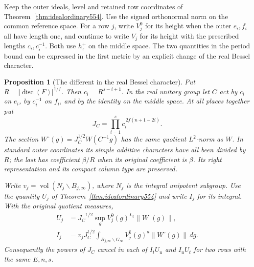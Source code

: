 \documentclass[a4paper,11pt]{article}
\newtheorem{proposition}{Proposition}[section]
\theoremstyle{definition}
\theoremstyle{remark}
\numberwithin{equation}{section}
\begin{document}
Keep the outer ideals, level and retained row coordinates of
Theorem~\ref{thm:idealordinary554}. Use the signed orthonormal
norm on the common reference space. For a row \(j\), write
\(V_j^0\) for its height when the outer \(e_i,f_i\) all have
length one, and continue to write \(V_j\) for its height with
the prescribed lengths \(c_i,c_i^{-1}\). Both use \(h_z^+\) on
the middle space. The two quantities in the period bound can
be expressed in the first metric by an explicit change of the
real Bessel character.

\begin{proposition}[The different in the real Bessel character]
\leavevmode\label{prop:archdifferent555}
Put \(R=|\operatorname{disc}(F)|^{1/f}\). Then
\(c_i=R^{s-i+1}\). In the real unitary group let \(C\) act
by \(c_i\) on \(e_i\), by \(c_i^{-1}\) on \(f_i\), and by the
identity on the middle space. At all places together put
\[
                   J_C=\prod_{i=1}^s c_i^{\,2f(n+1-2i)} .
\]
The section \(W^\circ(g)=J_C^{1/2}W(C^{-1}g)\) has the same
quotient \(L^2\)-norm as \(W\). In standard outer coordinates
its simple additive characters have all been divided by \(R\);
the last has coefficient \(\beta/R\) when its original
coefficient is \(\beta\). Its right representation and its
compact column type are preserved.

Write \(v_j=\operatorname{vol}(N_j\backslash B_{j,\infty})\),
where \(N_j\) is the integral unipotent subgroup. Use the
quantity \(U_j\) of Theorem~\ref{thm:idealordinary554} and write
\(I_j\) for its integral. With the original quotient measures,
\[
 \begin{aligned}
 U_j&=J_C^{-1/2}\sup_g V_j^0(g)^{L_0}\|W^\circ(g)\|,\\
 I_j&=v_jJ_C^{1/2}\!
       \int_{B_{j,\infty}\backslash G_\infty}
                  V_j^0(g)^a\|W^\circ(g)\|\,d\dot g .
 \end{aligned}
\]
Consequently the powers of \(J_C\) cancel in each of
\(I_tU_u\) and \(I_uU_t\) for two rows with the same \(E,n,s\).
\end{proposition}
\end{document}
